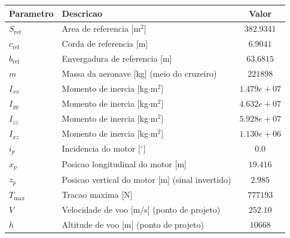 \begin{tabular}{llc}
\toprule
Parametro & Descricao & Valor \\
\midrule
$S_{\mathrm{ref}}$ & Area de referencia [m$^2$] & $382.9341$ \\
$c_{\mathrm{ref}}$ & Corda de referencia [m] & $6.9041$ \\
$b_{\mathrm{ref}}$ & Envergadura de referencia [m] & $63.6815$ \\
$m$ & Massa da aeronave [kg] (meio do cruzeiro) & $221898$ \\
$I_{xx}$ & Momento de inercia [kg$\cdot$m$^2$] & $1.479e+07$ \\
$I_{yy}$ & Momento de inercia [kg$\cdot$m$^2$] & $4.632e+07$ \\
$I_{zz}$ & Momento de inercia [kg$\cdot$m$^2$] & $5.928e+07$ \\
$I_{xz}$ & Momento de inercia [kg$\cdot$m$^2$] & $1.130e+06$ \\
$i_p$ & Incidencia do motor [$^\circ$] & $0.0$ \\
$x_p$ & Posicao longitudinal do motor [m] & $19.416$ \\
$z_p$ & Posicao vertical do motor [m] (sinal invertido) & $2.985$ \\
$T_{\max}$ & Tracao maxima [N] & $777193$ \\
$V$ & Velocidade de voo [m/s] (ponto de projeto) & $252.10$ \\
$h$ & Altitude de voo [m] (ponto de projeto) & $10668$ \\
\bottomrule
\end{tabular}
